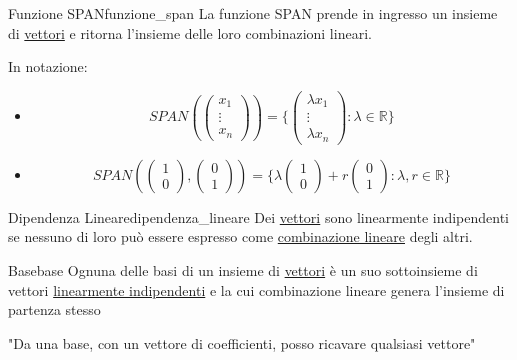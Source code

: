 \documentclass{article}
\begin{document}
\begin{definition}{Funzione SPAN}{funzione_span}
    La funzione SPAN prende in ingresso un insieme di \hyperref[def:vettore]{vettori} e ritorna l'insieme delle loro combinazioni lineari.
    
    In notazione: \begin{itemize}
        \item \[SPAN(\begin{pmatrix}
            x_1 \\
            \vdots \\
            x_n
            \end{pmatrix}) = \{\begin{pmatrix}
            \lambda x_1 \\
            \vdots \\
            \lambda x_n
            \end{pmatrix} : \lambda \in \mathbb{R}\}\]
        \item \[SPAN(\begin{pmatrix}
            1 \\
            0
            \end{pmatrix}, \begin{pmatrix}
            0 \\
            1
            \end{pmatrix}) = \{ \lambda\begin{pmatrix}
            1 \\
            0
            \end{pmatrix} + r\begin{pmatrix}
            0 \\
            1
            \end{pmatrix} : \lambda, r \in \mathbb{R}\}\]
    \end{itemize}
\end{definition}

\begin{definition}{Dipendenza Lineare}{dipendenza_lineare}
    Dei \hyperref[def:vettore]{vettori} sono linearmente indipendenti se nessuno di loro può essere espresso come \hyperref[def:combinazione_lineare]{combinazione lineare} degli altri.
\end{definition}

\begin{definition}{Base}{base}
    Ognuna delle basi di un insieme di \hyperref[def:vettore]{vettori} è un suo sottoinsieme di vettori \hyperref[def:dipendenza_lineare]{linearmente indipendenti} e la cui combinazione lineare genera l'insieme di partenza stesso

    "Da una base, con un vettore di coefficienti, posso ricavare qualsiasi vettore"
\end{definition}
\end{document}
